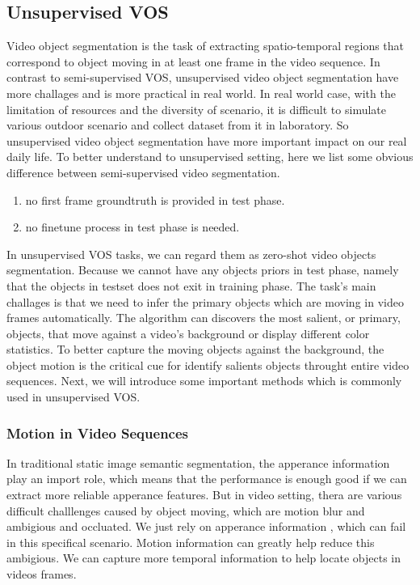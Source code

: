 \subsection{Unsupervised VOS}
Video object segmentation is the task of extracting spatio-temporal regions that correspond to object moving in at
least one frame in the video sequence. In contrast to semi-supervised VOS, unsupervised video object segmentation have 
more challages and is more practical in real world. In real world case, with the limitation of resources and the diversity of scenario,
it is difficult to simulate various outdoor scenario and collect dataset from it in laboratory. So unsupervised video object 
segmentation have more important impact on our real daily life. To better understand to unsupervised setting, here we list some
obvious difference between semi-supervised video segmentation.
\begin{enumerate}
    \item no first frame groundtruth is provided in test phase.
    \item no finetune process in test phase is needed.
\end{enumerate}

In unsupervised VOS tasks, we can regard them as zero-shot video objects segmentation. Because we cannot have any objects priors
in test phase, namely that the objects in testset does not exit in training phase. The task's main challages is that we need to infer
the primary objects which are moving in video frames automatically. The algorithm can discovers the most salient, or primary, objects,
that move against a video's background or display different color statistics. To better capture the moving objects against the background,
the object motion is the critical cue for identify salients objects throught entire video sequences. Next, we will introduce some important
methods which is commonly used in unsupervised VOS.

\subsubsection{Motion in Video Sequences}
In traditional static image semantic segmentation, the apperance information play an import role, which means that 
the performance is enough good if we can extract more reliable apperance features. But in video setting, thera are various
difficult challlenges caused by object moving, which are motion blur and ambigious and occluated. We just rely on apperance information
, which can  fail in this specifical scenario. Motion information can greatly help reduce this ambigious. We can capture more temporal information
to help locate objects in videos frames.

